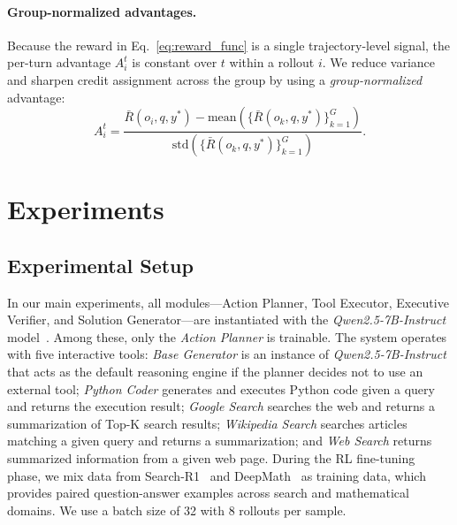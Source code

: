 \paragraph{Group-normalized advantages.}
Because the reward in Eq.~\ref{eq:reward_func} is a single trajectory-level signal, the per-turn advantage $A_i^t$ is constant over $t$ within a rollout $i$. We reduce variance and sharpen credit assignment across the group by using a \emph{group-normalized} advantage:
\vspace{-1mm}
\begin{equation}
    \label{eq:advantage_norm}
    A_i^t = \frac{\bar{R}(o_i, q, y^*) - \mathrm{mean}\left( \{ \bar{R}(o_k, q, y^*) \}_{k=1}^{G} \right)}{\mathrm{std}\left( \{ \bar{R}(o_k, q, y^*) \}_{k=1}^{G} \right)}.
\end{equation}





\section{Experiments}
\label{sec:experiments}
\vspace{-1mm}

\subsection{Experimental Setup}
\label{subsection:exp_setup}



In our main experiments, all modules—{Action Planner}, {Tool Executor}, {Executive Verifier}, and {Solution Generator}—are instantiated with the \textit{Qwen2.5-7B-Instruct} model~\citep{yang2024qwen2.5}. Among these, only the \textit{Action Planner} is trainable. The system operates with five interactive tools: \textit{Base Generator} is an instance of \textit{Qwen2.5-7B-Instruct} that acts as the default reasoning engine if the planner decides not to use an external tool; \textit{Python Coder} generates and executes Python code given a query and returns the execution result; \textit{Google Search} searches the web and returns a summarization of Top-K search results; \textit{Wikipedia Search} searches articles matching a given query and returns a summarization; and \textit{Web Search} returns summarized information from a given web page. During the RL fine-tuning phase, we mix data from Search-R1~\citep{jin2025search} and DeepMath~\citep{he2025deepmath} as training data, which provides paired question-answer examples across search and mathematical domains. We use a batch size of 32 with 8 rollouts per sample.

